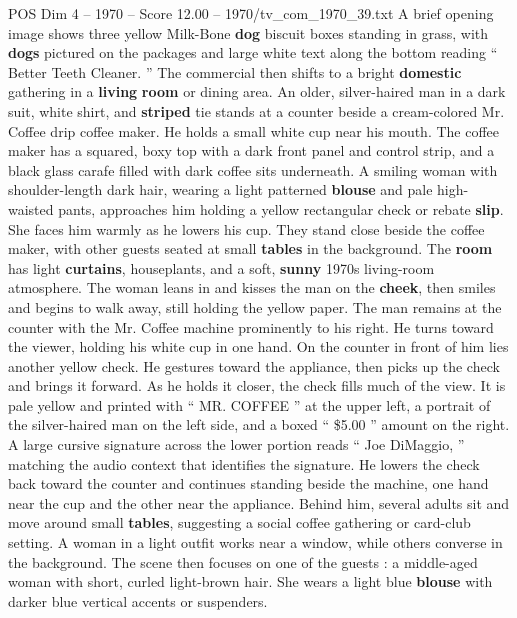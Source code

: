 \begin{textsample}{POS Dim 4 – 1970 – Score 12.00 – 1970/tv\_com\_1970\_39.txt}  \label{ex:f4_pos_089}
A brief opening image shows three yellow Milk-Bone \textbf{dog} biscuit boxes standing in grass, with \textbf{dogs} pictured on the packages and large white text along the bottom reading “ Better Teeth Cleaner. ” The commercial then shifts to a bright \textbf{domestic} gathering in a \textbf{living} \textbf{room} or dining area.
An older, silver-haired man in a dark suit, white shirt, and \textbf{striped} tie stands at a counter beside a cream-colored Mr.
Coffee drip coffee maker.
He holds a small white cup near his mouth.
The coffee maker has a squared, boxy top with a dark front panel and control strip, and a black glass carafe filled with dark coffee sits underneath.
A smiling woman with shoulder-length dark hair, wearing a light patterned \textbf{blouse} and pale high-waisted pants, approaches him holding a yellow rectangular check or rebate \textbf{slip}.
She faces him warmly as he lowers his cup.
They stand close beside the coffee maker, with other guests seated at small \textbf{tables} in the background.
The \textbf{room} has light \textbf{curtains}, houseplants, and a soft, \textbf{sunny} 1970s living-room atmosphere.
The woman leans in and kisses the man on the \textbf{cheek}, then smiles and begins to walk away, still holding the yellow paper.
The man remains at the counter with the Mr.
Coffee machine prominently to his right.
He turns toward the viewer, holding his white cup in one hand.
On the counter in front of him lies another yellow check.
He gestures toward the appliance, then picks up the check and brings it forward.
As he holds it closer, the check fills much of the view.
It is pale yellow and printed with “ MR.
COFFEE ” at the upper left, a portrait of the silver-haired man on the left side, and a boxed “ \$5.00 ” amount on the right.
A large cursive signature across the lower portion reads “ Joe DiMaggio, ” matching the audio context that identifies the signature.
He lowers the check back toward the counter and continues standing beside the machine, one hand near the cup and the other near the appliance.
Behind him, several adults sit and move around small \textbf{tables}, suggesting a social coffee gathering or card-club setting.
A woman in a light outfit works near a window, while others converse in the background.
The scene then focuses on one of the guests : a middle-aged woman with short, curled light-brown hair.
She wears a light blue \textbf{blouse} with darker blue vertical accents or suspenders.

\end{textsample}
